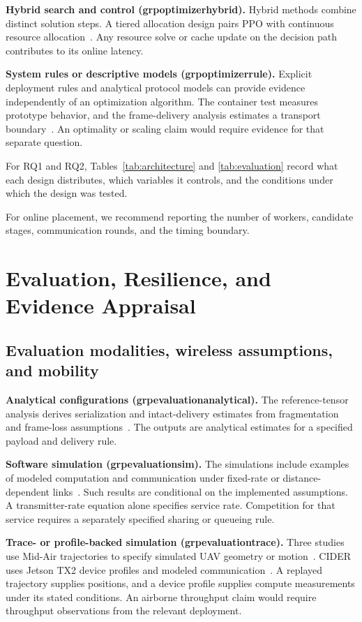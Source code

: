 \documentclass[journal]{IEEEtran}
\newcommand{\groupcite}[2]{\csname grp#1#2\endcsname}
\begin{document}
\textbf{Hybrid search and control (\groupcite{optimizer}{hybrid}).}
Hybrid methods combine distinct solution steps. A tiered allocation design pairs PPO with continuous resource allocation~\cite{R0001}. Any resource solve or cache update on the decision path contributes to its online latency.

\textbf{System rules or descriptive models (\groupcite{optimizer}{rule}).}
Explicit deployment rules and analytical protocol models can provide evidence independently of an optimization algorithm. The container test measures prototype behavior, and the frame-delivery analysis estimates a transport boundary~\cite{R0038,R0121}. An optimality or scaling claim would require evidence for that separate question.

For RQ1 and RQ2, Tables~\ref{tab:architecture} and \ref{tab:evaluation} record what each design distributes, which variables it controls, and the conditions under which the design was tested.

For online placement, we recommend reporting the number of workers, candidate stages, communication rounds, and the timing boundary.



\section{Evaluation, Resilience, and Evidence Appraisal}\label{sec:evaluation}
\subsection{Evaluation modalities, wireless assumptions, and mobility}
\textbf{Analytical configurations (\groupcite{evaluation}{analytical}).}
The reference-tensor analysis derives serialization and intact-delivery estimates from fragmentation and frame-loss assumptions~\cite{R0121}. The outputs are analytical estimates for a specified payload and delivery rule.

\textbf{Software simulation (\groupcite{evaluation}{sim}).}
The simulations include examples of modeled computation and communication under fixed-rate or distance-dependent links~\cite{R0015,R0022}. Such results are conditional on the implemented assumptions. A transmitter-rate equation alone specifies service rate. Competition for that service requires a separately specified sharing or queueing rule.

\textbf{Trace- or profile-backed simulation (\groupcite{evaluation}{trace}).}
Three studies use Mid-Air trajectories to specify simulated UAV geometry or motion~\cite{R0003,R0010,R0059}. CIDER uses Jetson TX2 device profiles and modeled communication~\cite{R0075}. A replayed trajectory supplies positions, and a device profile supplies compute measurements under its stated conditions. An airborne throughput claim would require throughput observations from the relevant deployment.
\end{document}

